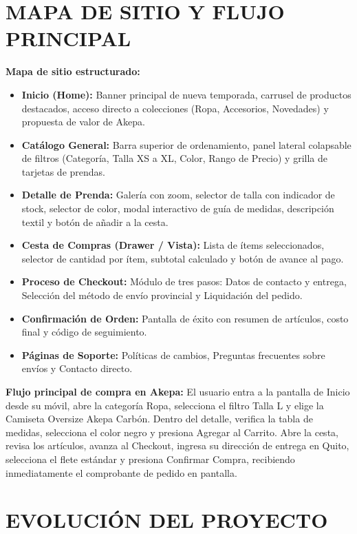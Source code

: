 \documentclass[12pt]{article}
\begin{document}
\section*{MAPA DE SITIO Y FLUJO PRINCIPAL}
\textbf{Mapa de sitio estructurado:}
\begin{itemize}
    \item \textbf{Inicio (Home):} Banner principal de nueva temporada, carrusel de productos destacados, acceso directo a colecciones (Ropa, Accesorios, Novedades) y propuesta de valor de Akepa.
    \item \textbf{Catálogo General:} Barra superior de ordenamiento, panel lateral colapsable de filtros (Categoría, Talla XS a XL, Color, Rango de Precio) y grilla de tarjetas de prendas.
    \item \textbf{Detalle de Prenda:} Galería con zoom, selector de talla con indicador de stock, selector de color, modal interactivo de guía de medidas, descripción textil y botón de añadir a la cesta.
    \item \textbf{Cesta de Compras (Drawer / Vista):} Lista de ítems seleccionados, selector de cantidad por ítem, subtotal calculado y botón de avance al pago.
    \item \textbf{Proceso de Checkout:} Módulo de tres pasos: Datos de contacto y entrega, Selección del método de envío provincial y Liquidación del pedido.
    \item \textbf{Confirmación de Orden:} Pantalla de éxito con resumen de artículos, costo final y código de seguimiento.
    \item \textbf{Páginas de Soporte:} Políticas de cambios, Preguntas frecuentes sobre envíos y Contacto directo.
\end{itemize}

\textbf{Flujo principal de compra en Akepa:}
El usuario entra a la pantalla de Inicio desde su móvil, abre la categoría Ropa, selecciona el filtro Talla L y elige la Camiseta Oversize Akepa Carbón. Dentro del detalle, verifica la tabla de medidas, selecciona el color negro y presiona Agregar al Carrito. Abre la cesta, revisa los artículos, avanza al Checkout, ingresa su dirección de entrega en Quito, selecciona el flete estándar y presiona Confirmar Compra, recibiendo inmediatamente el comprobante de pedido en pantalla.

\section*{EVOLUCIÓN DEL PROYECTO}
\end{document}
